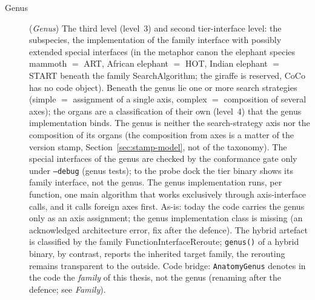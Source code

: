 \begin{description}
  \item[Genus] (\emph{Genus}) The third level (level~3) and second tier-interface level: the
  subspecies, the implementation of the family interface with possibly extended special interfaces (in
  the metaphor canon the elephant species mammoth $=$ ART, African elephant $=$ HOT, Indian elephant
  $=$ START beneath the family SearchAlgorithm; the giraffe is reserved, CoCo has no code object).
  Beneath the genus lie one or more search strategies (simple $=$ assignment of a single axis,
  complex $=$ composition of several axes); the organs are a classification of their own (level~4)
  that the genus implementation binds. The genus is neither the search-strategy axis nor the
  composition of its organs (the composition from axes is a matter of the version stamp,
  Section~\ref{sec:stamp-model}, not of the taxonomy). The special interfaces of the genus are checked by
  the conformance gate only under \texttt{--debug} (genus tests); to the probe dock the tier binary shows
  its family interface, not the genus. The genus implementation runs, per function, one main algorithm
  that works exclusively through axis-interface calls, and it calls foreign axes first. As-is: today the code carries the genus only as an axis assignment; the genus
  implementation class is missing (an acknowledged architecture error, fix after the defence). The
  hybrid artefact is classified by the family FunctionInterfaceReroute; \texttt{genus()} of a hybrid
  binary, by contrast, reports the inherited target family, the rerouting remains transparent to the
  outside. Code bridge: \texttt{AnatomyGenus} denotes in the code the \emph{family} of this thesis,
  not the genus (renaming after the defence; see \emph{Family}).
 

\end{description}
